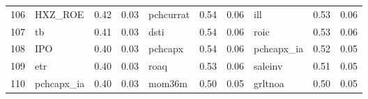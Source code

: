 \documentclass[12pt]{article}
\begin{document}
\begin{landscape}
\begin{footnotesize}
\begin{longtable}{l|lcc|lcc|lcc}
			106                   & HXZ\_ROE                    & 0.42                                                                                 & 0.03                            & pchcurrat                   & 0.54                                                                                 & 0.06                            & ill                         & 0.53                                                                                 & 0.06                           \\
			107                   & tb                          & 0.41                                                                                 & 0.03                            & dsti                        & 0.54                                                                                 & 0.06                            & roic                        & 0.53                                                                                 & 0.06                           \\
			108                   & IPO                         & 0.40                                                                                 & 0.03                            & pchcapx                     & 0.54                                                                                 & 0.06                            & pchcapx\_ia                 & 0.52                                                                                 & 0.05                           \\
			109                   & etr                         & 0.40                                                                                 & 0.03                            & roaq                        & 0.53                                                                                 & 0.06                            & saleinv                     & 0.51                                                                                 & 0.05                           \\
			110                   & pchcapx\_ia                 & 0.40                                                                                 & 0.03                            & mom36m                      & 0.50                                                                                 & 0.05                            & grltnoa                     & 0.50                                                                                 & 0.05                           \\

\end{longtable}
\end{footnotesize}
\end{landscape}
\end{document}
